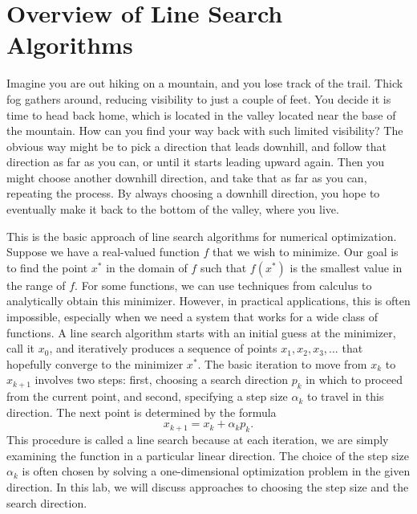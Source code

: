 \label{lab:line_search}

\section*{Overview of Line Search Algorithms}
Imagine you are out hiking on a mountain, and you lose track of the trail. Thick fog
gathers around, reducing visibility to just a couple of feet. You decide it is time
to head back home, which is located in the valley located near the base of the mountain.
How can you find your way back with such limited visibility? The obvious way might be to
pick a direction that leads downhill, and follow that direction as far as you can, or
until it starts leading upward again. Then you might choose another downhill direction,
and take that as far as you can, repeating the process. By always choosing a downhill
direction, you hope to eventually make it back to the bottom of the valley, where you live.

This is the basic approach of line search algorithms for numerical optimization.
Suppose we have a real-valued function $f$ that we wish to minimize. Our goal is to find the
point $x^*$ in the domain of $f$ such that $f(x^*)$ is the smallest value in the range of
$f$. For some functions, we can use techniques from calculus to analytically obtain this
minimizer. However, in practical applications, this is often impossible, especially when
we need a system that works for a wide class of functions. A line search algorithm starts with
an initial guess at the minimizer, call it $x_0$, and iteratively produces a sequence of
points $x_1, x_2, x_3, \ldots$ that hopefully converge to the minimizer $x^*$. The basic
iteration to move from $x_k$ to $x_{k+1}$ involves two steps: first, choosing a search direction $p_k$
in which to proceed from the current point, and second, specifying a step size $\alpha_k$ to travel
in this direction. The next point is determined by the formula
$$
x_{k+1} = x_k + \alpha_kp_k.
$$
This procedure is called a line search because at each iteration, we are simply examining the
function in a particular linear direction. The choice of the step size $\alpha_k$ is often
chosen by solving a one-dimensional optimization problem in the given direction. In this lab,
we will discuss approaches to choosing the step size and the search direction.

